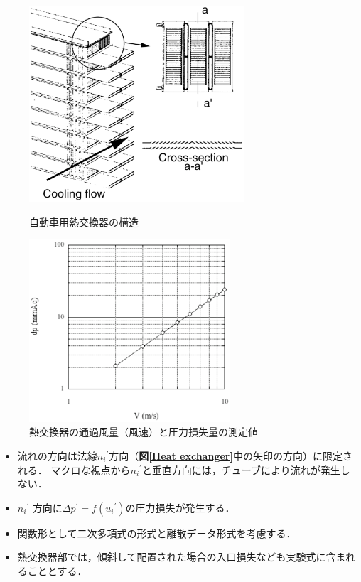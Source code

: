 \begin{figure}[htbp]
  \begin{minipage}{.47\textwidth}
  	\begin{center}
  	\includegraphics[width=8cm,clip]{HeatExchanger.eps}
  	\end{center}
  	\caption{自動車用熱交換器の構造}
	\label{Heat exchanger}
  \end{minipage} \hfill
  \begin{minipage}{.47\textwidth}
	\begin{center}
  	\includegraphics[width=7.5cm,clip]{Pressureloss.eps}
  	\end{center}
  	\caption{熱交換器の通過風量（風速）と圧力損失量の測定値}
  	\label{pressure drop}
  \end{minipage}
\end{figure}

\begin{itemize}
\item 流れの方向は法線${n_{i}}^{\prime}$方向（\textbf{図\ref{Heat exchanger}}中の矢印の方向）に限定される．
マクロな視点から${n_{i}}^{\prime}$と垂直方向には，チューブにより流れが発生しない．
\item ${n_{i}}^{\prime}$ 方向に$\Delta p^{\prime} = f({u_{i}}^{\prime})$の圧力損失が発生する．
\item 関数形として二次多項式の形式と離散データ形式を考慮する．
\item 熱交換器部では，傾斜して配置された場合の入口損失なども実験式に含まれることとする．
\end{itemize}

